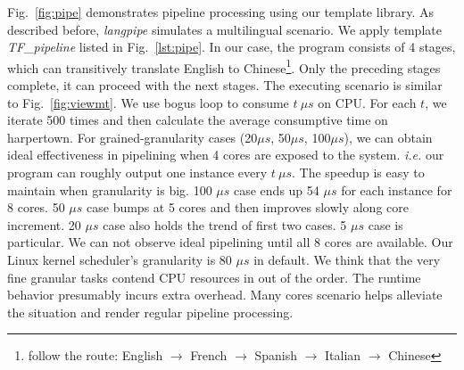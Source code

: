 Fig.~\ref{fig:pipe} demonstrates pipeline processing using our
template library. As described before, \textit{langpipe} simulates a
multilingual scenario. We apply template \emph{TF\_pipeline} listed in
Fig.~\ref{lst:pipe}. In our case, the program consists of  4 stages,
which can transitively translate English to Chinese\footnote{follow the 
  route: English  $\to$ French $\to$ Spanish $\to$ Italian $\to$
  Chinese}. Only the preceding stages complete,  it can proceed with
the next stages. The executing scenario is similar to Fig.~\ref{fig:viewmt}. We use bogus loop to consume $t \  \mu s$ on CPU. For each $t$, we iterate 500
times and then calculate the average consumptive time on harpertown. For
grained-granularity cases (20$\mu s$, 50$\mu s$, 100$\mu s$), we can obtain ideal
effectiveness in pipelining when 4 cores are exposed to the system.
\textit{i.e.} our program can roughly output one instance every $t\  \mu
s$. The speedup is easy to maintain when granularity is big. 100 $\mu s$ case ends up 54 $\mu s$ for each instance for 8 cores. 50  $\mu s$ case
bumps at 5 cores and then improves slowly along core increment. 20
$\mu s$ case also holds the trend of first two cases. 5 $\mu s$ case is
particular. We can not observe ideal pipelining until all 8
cores are available.  Our Linux kernel scheduler's granularity is 80
$\mu s$ in default. We think that the very fine granular tasks contend
CPU resources in out of the order. The runtime behavior presumably
incurs extra overhead. Many cores scenario helps alleviate the
situation and render regular pipeline processing.

